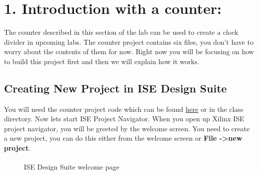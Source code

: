 \documentclass{article}
\begin{document}
\newpage
\section{1. Introduction with a counter:}
The counter described in this section of the lab can be used to create a clock divider in upcoming labs. The counter project contains six files, you don't have to worry about the contents of them for now. Right now you will be focusing on how to build this project first and then we will explain how it works.

\subsection{Creating New Project in ISE Design Suite}

You will need the counter project code which can be found \href{https://github.com/reiuiji/ECE368-Lab/tree/master/Lab%202/Counter}{here} or in the class directory.
Now lets start ISE Project Navigator. When you open up Xilinx ISE project navigator, you will be greeted by the welcome screen. You need to create a new project, you can do this either from the welcome screen or \textbf{File -\textgreater new project}.

\begin{figure}[!h]
  \centering
  \caption{ISE\textsuperscript{\textregistered} Design Suite welcome page}
\end{figure}
\end{document}
